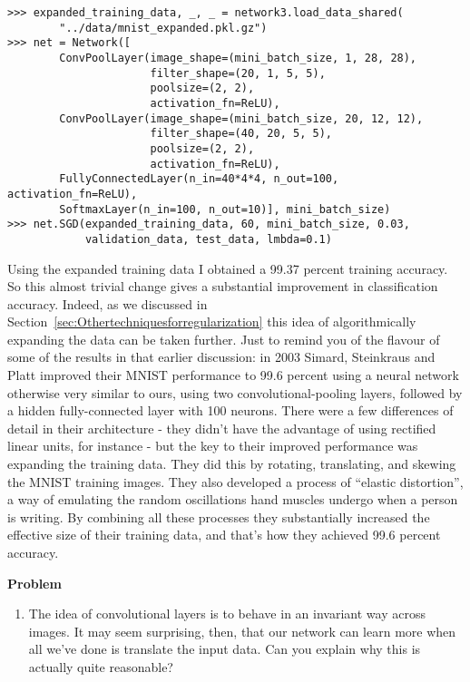 \begin{lstlisting}
>>> expanded_training_data, _, _ = network3.load_data_shared(
        "../data/mnist_expanded.pkl.gz")
>>> net = Network([
        ConvPoolLayer(image_shape=(mini_batch_size, 1, 28, 28), 
                      filter_shape=(20, 1, 5, 5), 
                      poolsize=(2, 2), 
                      activation_fn=ReLU),
        ConvPoolLayer(image_shape=(mini_batch_size, 20, 12, 12), 
                      filter_shape=(40, 20, 5, 5), 
                      poolsize=(2, 2), 
                      activation_fn=ReLU),
        FullyConnectedLayer(n_in=40*4*4, n_out=100, activation_fn=ReLU),
        SoftmaxLayer(n_in=100, n_out=10)], mini_batch_size)
>>> net.SGD(expanded_training_data, 60, mini_batch_size, 0.03, 
            validation_data, test_data, lmbda=0.1)
\end{lstlisting}

Using the expanded training data I obtained a 99.37 percent training accuracy. So this almost trivial change gives a substantial improvement in classification accuracy. Indeed, as we discussed in Section~\ref{sec:Othertechniquesforregularization} this idea of algorithmically expanding the data can be taken further. Just to remind you of the flavour of some of the results in that earlier discussion: in 2003 Simard, Steinkraus and Platt \cite{Simard:2003:BPC:938980.939477} improved their MNIST performance to 99.6 percent using a neural network otherwise very similar to ours, using two convolutional-pooling layers, followed by a hidden fully-connected layer with 100 neurons. There were a few differences of detail in their architecture - they didn't have the advantage of using rectified linear units, for instance - but the key to their improved performance was expanding the training data. They did this by rotating, translating, and skewing the MNIST training images. They also developed a process of ``elastic distortion'', a way of emulating the random oscillations hand muscles undergo when a person is writing. By combining all these processes they substantially increased the effective size of their training data, and that's how they achieved 99.6 percent accuracy.

\textbf{Problem}
\begin{enumerate}
\item The idea of convolutional layers is to behave in an invariant way across images. It may seem surprising, then, that our network can learn more when all we've done is translate the input data. Can you explain why this is actually quite reasonable? 
\end{enumerate}

